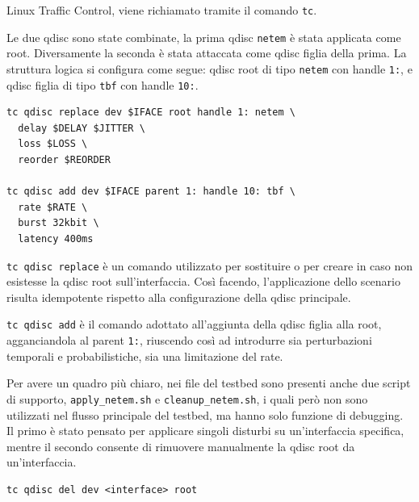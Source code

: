 Linux Traffic Control, viene richiamato tramite il comando \texttt{tc}.

Le due qdisc sono state combinate, la prima qdisc \texttt{netem} è stata
applicata come root. Diversamente la seconda è stata attaccata come qdisc figlia
della prima. La struttura logica si configura come segue: qdisc root di tipo \texttt{netem}
con handle \texttt{1:}, e qdisc figlia di tipo \texttt{tbf} con handle \texttt{10:}.

\begin{listing}[H]
\begin{verbatim}
tc qdisc replace dev $IFACE root handle 1: netem \
  delay $DELAY $JITTER \
  loss $LOSS \
  reorder $REORDER

tc qdisc add dev $IFACE parent 1: handle 10: tbf \
  rate $RATE \
  burst 32kbit \
  latency 400ms
\end{verbatim}
\caption{Schema generale di applicazione di netem e tbf.}
\label{lst:tc-netem-tbf-generale}
\end{listing}

\texttt{tc qdisc replace} è un comando utilizzato per sostituire o per creare in
caso non esistesse la qdisc root sull'interfaccia. Così facendo, l'applicazione
dello scenario risulta idempotente rispetto alla configurazione della qdisc
principale.

\texttt{tc qdisc add} è il comando adottato all'aggiunta della qdisc figlia alla root,
agganciandola al parent \texttt{1:}, riuscendo così ad introdurre sia
perturbazioni temporali e probabilistiche, sia una limitazione del rate.

Per avere un quadro più chiaro, nei file del testbed sono presenti 
anche due script di supporto, \texttt{apply\_netem.sh} e \texttt{cleanup\_netem.sh}, i
quali però non sono utilizzati nel flusso principale del testbed, ma hanno solo funzione
di debugging. Il primo è stato pensato per applicare singoli disturbi su un'interfaccia
specifica, mentre il secondo consente di rimuovere manualmente la qdisc root da un'interfaccia.

\begin{listing}[H]
\begin{verbatim}
tc qdisc del dev <interface> root
\end{verbatim}
\caption{Rimozione manuale di una qdisc da un'interfaccia.}
\label{lst:tc-cleanup}
\end{listing}

